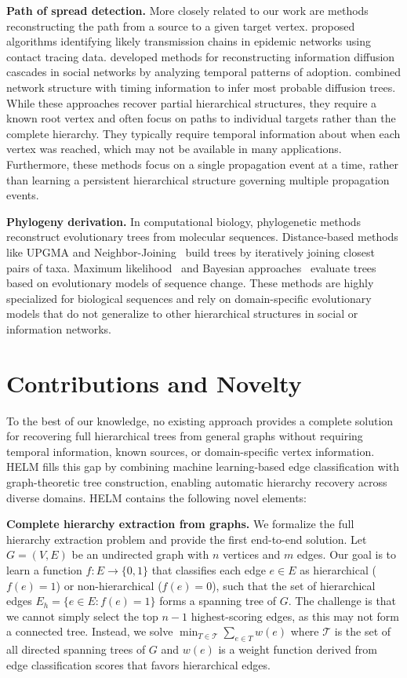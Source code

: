 \documentclass{article}
\begin{document}
    \textbf{Path of spread detection.} More closely related to our work are methods reconstructing the path from a source to a given target vertex. \citet{gomezrodriguez2011inferring} proposed algorithms identifying likely transmission chains in epidemic networks using contact tracing data. \citet{myers2014bursty} developed methods for reconstructing information diffusion cascades in social networks by analyzing temporal patterns of adoption. \citet{farajtabar2016back} combined network structure with timing information to infer most probable diffusion trees. While these approaches recover partial hierarchical structures, they require a known root vertex and often focus on paths to individual targets rather than the complete hierarchy. They typically require temporal information about when each vertex was reached, which may not be available in many applications. Furthermore, these methods focus on a single propagation event at a time, rather than learning a persistent hierarchical structure governing multiple propagation events.

    \textbf{Phylogeny derivation.} In computational biology, phylogenetic methods reconstruct evolutionary trees from molecular sequences. Distance-based methods like UPGMA and Neighbor-Joining~\citep{saitou1987neighbor} build trees by iteratively joining closest pairs of taxa. Maximum likelihood~\citep{felsenstein1981evolutionary} and Bayesian approaches~\citep{huelsenbeck2001mrbayes} evaluate trees based on evolutionary models of sequence change. These methods are highly specialized for biological sequences and rely on domain-specific evolutionary models that do not generalize to other hierarchical structures in social or information networks.

    \section{Contributions and Novelty}
    To the best of our knowledge, no existing approach provides a complete solution for recovering full hierarchical trees from general graphs without requiring temporal information, known sources, or domain-specific vertex information. HELM fills this gap by combining machine learning-based edge classification with graph-theoretic tree construction, enabling automatic hierarchy recovery across diverse domains. HELM contains the following novel elements:

    \textbf{Complete hierarchy extraction from graphs.} We formalize the full hierarchy extraction problem and provide the first end-to-end solution. Let $G = (V, E)$ be an undirected graph with $n$ vertices and $m$ edges. Our goal is to learn a function $f : E \rightarrow \{0, 1\}$ that classifies each edge $e \in E$ as hierarchical ($f(e) = 1$) or non-hierarchical ($f(e) = 0$), such that the set of hierarchical edges $E_{h}= \{e \in E : f(e) = 1\}$ forms a spanning tree of $G$. The challenge is that we cannot simply select the top $n - 1$ highest-scoring edges, as this may not form a connected tree. Instead, we solve $\min_{T \in \mathcal{T}}\sum_{e\in T}w(e)$ where $\mathcal{T}$ is the set of all directed spanning trees of $G$ and $w(e)$ is a weight function derived from edge classification scores that favors hierarchical edges.
\end{document}
